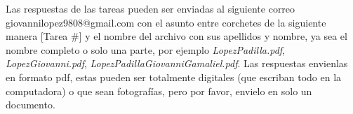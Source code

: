 \documentclass[12pt,letterpaper]{report}
\begin{document}
Las respuestas de las tareas pueden 
ser enviadas al siguiente correo giovannilopez9808@gmail.com 
con el asunto entre corchetes de la siguiente manera [Tarea \#] y el nombre del archivo con sus apellidos y nombre, ya sea el nombre completo o solo una parte, por ejemplo \textit{LopezPadilla.pdf}, \textit{LopezGiovanni.pdf}, \textit{LopezPadillaGiovanniGamaliel.pdf}. Las respuestas envienlas en formato pdf, estas pueden ser totalmente digitales (que escriban todo en la computadora) o que sean fotografías, pero por favor, envielo en solo un documento.
\end{document}
